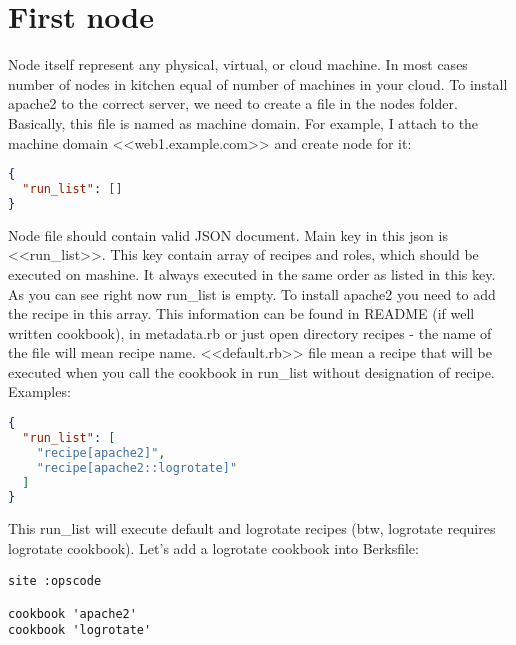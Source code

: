 \section{First node}

Node itself represent any physical, virtual, or cloud machine. In most cases number of nodes in kitchen equal of number of machines in your cloud. To install apache2 to the correct server, we need to create a file in the nodes folder. Basically, this file is named as machine domain. For example, I attach to the machine domain <<web1.example.com>> and create node for it:

\begin{lstlisting}[language=JSON,label=lst:my-cloud-node1,title=my-cloud/nodes/web1.example.com.json]
{
  "run_list": []
}
\end{lstlisting}

Node file should contain valid JSON document. Main key in this json is <<run\_list>>. This key contain array of recipes and roles, which should be executed on mashine. It always executed in the same order as listed in this key. As you can see right now run\_list is empty. To install apache2 you need to add the recipe in this array. This information can be found in README (if well written cookbook), in metadata.rb or just open directory recipes - the name of the file will mean recipe name. <<default.rb>> file mean a recipe that will be executed when you call the cookbook in run\_list without designation of recipe. Examples:

\begin{lstlisting}[language=JSON,label=lst:my-cloud-node2,title=my-cloud/nodes/web1.example.com.json]
{
  "run_list": [
    "recipe[apache2]",
    "recipe[apache2::logrotate]"
  ]
}
\end{lstlisting}

This run\_list will execute default and logrotate recipes (btw, logrotate requires logrotate cookbook). Let's add a logrotate cookbook into Berksfile:

\begin{lstlisting}[label=lst:my-cloud-node3,title=my-cloud/Berksfile]
site :opscode

cookbook 'apache2'
cookbook 'logrotate'
\end{lstlisting}